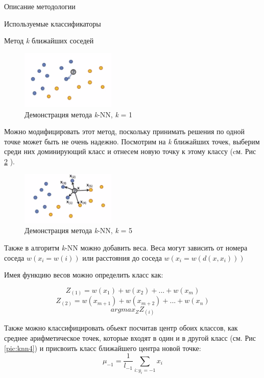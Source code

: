 \begin{section}{Описание методологии}
\begin{subsection}{Используемые классификаторы}
\begin{subsubsection}{Метод \textit{k} ближайших соседей}
\begin{figure}[ht!]
\centering
\includegraphics[width=0.4\textwidth]{pics/knn2}
\caption{Демонстрация метода \textit{k}-NN, \textit{k} = 1}
\label{pic:knn2}
\end{figure}

Можно модифицировать этот метод, поскольку принимать решения по одной точке может быть не очень надежно. Посмотрим на \textit{k} ближайших точек, выберим среди них доминирующий класс и отнесем новую точку к этому классу (cм. Рис \ref{pic:knn3} ).

\begin{figure}[ht!]
\centering
\includegraphics[width=0.4\textwidth]{pics/knn3}
\caption{Демонстрация метода \textit{k}-NN, \textit{k} = 5}
\label{pic:knn3}
\end{figure}




Также в алгоритм \textit{k}-NN можно добавить веса. Веса могут зависить от номера соседа $w(x_{i} = w(i))$ или расстояния до соседа $w(x_{i} = w(d(x, x_{i})))$

Имея функцию весов можно определить класс как:

\begin{equation}
Z_{(1)} = w(x_{1}) + w(x_{2}) + ... + w(x_{m})
\end{equation}
\begin{equation}
Z_{(2)} = w(x_{m + 1}) + w(x_{m + 2}) + ... + w(x_{n})
\end{equation}
\begin{equation}
arg⁡max_Z Z_{(i)}
\end{equation}

Также можно классифицировать обьект посчитав центр обоих классов, как среднее арифметическое точек, которые входят в один и в другой класс (см. Рис \ref{pic:knn4}) и присвоить класс ближайшего центра новой точке:
\begin{equation}
\mu_{-1} = \frac{1}{l_{-1}} \sum\limits_{i: y_i = -1} x_i
\end{equation}


\end{subsubsection}
\end{subsection}
\end{section}
